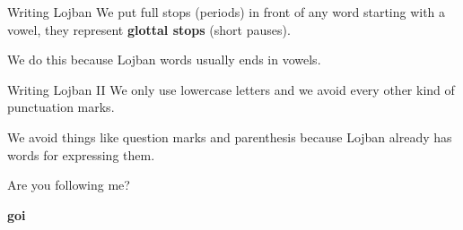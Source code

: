 \begin{frame}{Writing Lojban}
    We put full stops (periods) in front of any word starting with a vowel, they represent \textbf{glottal stops} (short pauses).

    We do this because Lojban words usually ends in vowels.
\end{frame}

\begin{frame}{Writing Lojban II}
    We only use lowercase letters and we avoid every other kind of punctuation marks.

    We avoid things like question marks and parenthesis because Lojban already has words for expressing them.
\end{frame}

\begin{frame}
    \centering
    \Large
    Are you following me?

    \pause
    \textbf{go\textquotesingle i}
\end{frame}
